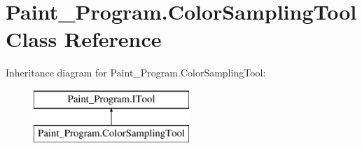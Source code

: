 \hypertarget{class_paint___program_1_1_color_sampling_tool}{}\section{Paint\+\_\+\+Program.\+Color\+Sampling\+Tool Class Reference}
\label{class_paint___program_1_1_color_sampling_tool}
Inheritance diagram for Paint\+\_\+\+Program.\+Color\+Sampling\+Tool\+:\begin{figure}[H]
\begin{center}
\leavevmode
\includegraphics[height=2.000000cm]{class_paint___program_1_1_color_sampling_tool}
\end{center}
\end{figure}
